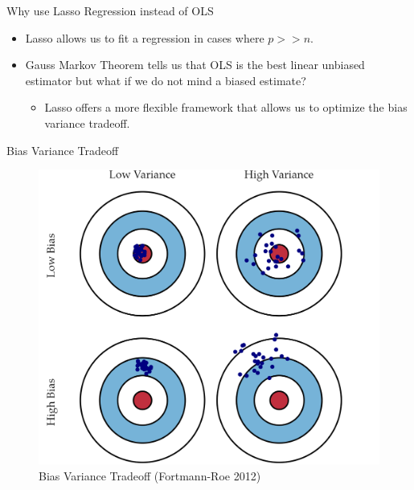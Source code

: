 \documentclass[
  11pt,
  ignorenonframetext,
]{beamer}
\providecommand{\tightlist}{%
  \setlength{\itemsep}{0pt}\setlength{\parskip}{0pt}}
\begin{document}
\begin{frame}{Why use Lasso Regression instead of OLS}
\protect\hypertarget{why-use-lasso-regression-instead-of-ols}{}
\begin{itemize}
\item
  Lasso allows us to fit a regression in cases where \(p>>n\).
\item
  Gauss Markov Theorem tells us that OLS is the best linear unbiased
  estimator but what if we do not mind a biased estimate?

  \begin{itemize}
  \tightlist
  \item
    Lasso offers a more flexible framework that allows us to optimize
    the bias variance tradeoff.
  \end{itemize}
\end{itemize}
\end{frame}

\begin{frame}{Bias Variance Tradeoff}
\protect\hypertarget{bias-variance-tradeoff}{}
\begin{figure}

{\centering \includegraphics[width=0.7\linewidth]{./../figures/Bias_Variance} 

}

\caption{Bias Variance Tradeoff (Fortmann-Roe 2012)}\label{fig:unnamed-chunk-4}
\end{figure}
\end{frame}
\end{document}
